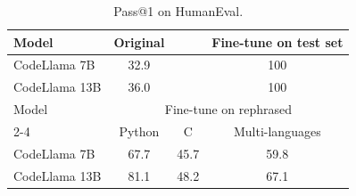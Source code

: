 
\begin{table}[t]
\centering
\caption{Pass@1 on HumanEval.}
\label{table:humaneval_basic_stats}
\footnotesize

\begin{tabular}{lccc}
\toprule
Model & Original & & Fine-tune on test set \\
\midrule
CodeLlama 7B   & 32.9 & & 100 \\
CodeLlama 13B  & 36.0 & & 100 \\
\midrule
Model & \multicolumn{3}{c}{Fine-tune on rephrased} \\
\cmidrule(lr){2-4}
& Python & C & Multi-languages \\
\midrule
CodeLlama 7B   & 67.7 & 45.7 & 59.8 \\
CodeLlama 13B  & 81.1 & 48.2 & 67.1 \\
\bottomrule
\end{tabular}
\vspace{-10pt}
\end{table}






